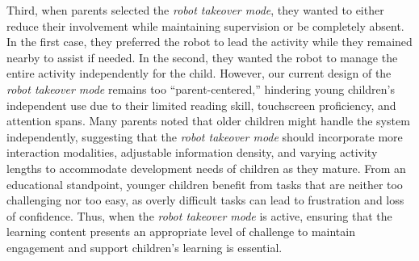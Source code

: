 Third, when parents selected the \textit{robot takeover mode}, they wanted to either reduce their involvement while maintaining supervision or be completely absent. In the first case, they preferred the robot to lead the activity while they remained nearby to assist if needed. In the second, they wanted the robot to manage the entire activity independently for the child. However, our current design of the \textit{robot takeover mode} remains too ``parent-centered,'' hindering young children's independent use due to their limited reading skill, touchscreen proficiency, and attention spans. Many parents noted that older children might handle the system independently, suggesting that the \textit{robot takeover mode} should incorporate more interaction modalities, adjustable information density, and varying activity lengths to accommodate development needs of children as they mature. From an educational standpoint, younger children benefit from tasks that are neither too challenging nor too easy, as overly difficult tasks can lead to frustration and loss of confidence. Thus, when the \textit{robot takeover mode} is active, ensuring that the learning content presents an appropriate level of challenge to maintain engagement and support children's learning is essential.





